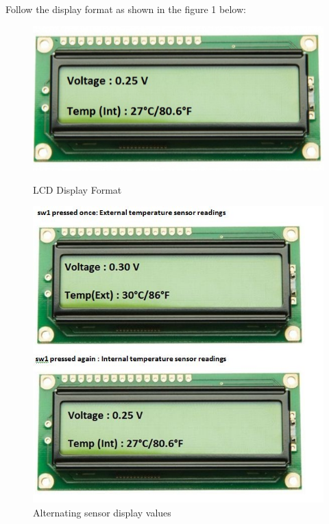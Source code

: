 \documentclass[a4paper,12pt,oneside]{book}
\begin{document}
Follow the display format as shown in the figure 1 below:
\begin{figure}
\centering
\includegraphics[scale=0.6]{lcd.PNG}
\caption{LCD Display Format}
\centering
\includegraphics[scale=0.5]{flow.JPG}
\caption{Alternating sensor display values}
\end{figure}



\newpage
\end{document}
